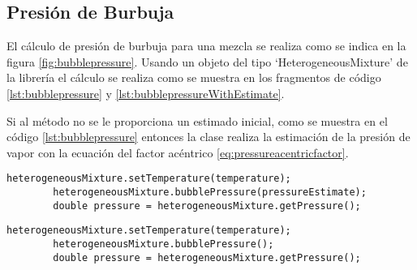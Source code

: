 \subsection{Presión de Burbuja}\label{subsec:bubblepressure}

	El cálculo de presión de burbuja para una mezcla se realiza como se indica en la figura \ref{fig:bubblepressure}. Usando un objeto del tipo `HeterogeneousMixture' de la librería \Materia el cálculo se realiza como se muestra en los fragmentos de código \ref{lst:bubblepressure} y \ref{lst:bubblepressureWithEstimate}.

	Si al método no se le proporciona un estimado inicial, como se muestra en el código \ref{lst:bubblepressure} entonces la clase realiza la estimación de la presión de vapor con la ecuación del factor acéntrico \ref{eq:pressureacentricfactor}. 



	\begin{lstlisting}[label={lst:bubblepressureWithEstimate},caption={Cálculo de la presión de burbuja proporcionando un estimado inicial.}]
		heterogeneousMixture.setTemperature(temperature);
		heterogeneousMixture.bubblePressure(pressureEstimate);
		double pressure = heterogeneousMixture.getPressure();
	\end{lstlisting}


	\begin{lstlisting}[label={lst:bubblepressure},caption={Cálculo de la presión de burbuja.}]
		heterogeneousMixture.setTemperature(temperature);
		heterogeneousMixture.bubblePressure();
		double pressure = heterogeneousMixture.getPressure();
	\end{lstlisting}

